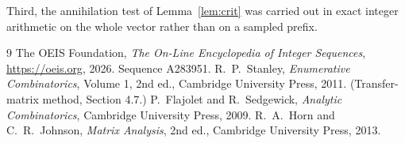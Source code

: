 \documentclass[11pt,a4paper]{article}
\theoremstyle{plain}
\theoremstyle{definition}
\begin{document}
Third, the annihilation test of Lemma~\ref{lem:crit} was carried out in exact integer
arithmetic on the whole vector rather than on a sampled prefix.

\begin{thebibliography}{9}
 The OEIS Foundation, \emph{The On-Line Encyclopedia of Integer
Sequences}, \url{https://oeis.org}, 2026. Sequence A283951.
 R.~P.~Stanley, \emph{Enumerative Combinatorics}, Volume 1, 2nd ed.,
Cambridge University Press, 2011. (Transfer-matrix method, Section 4.7.)
 P.~Flajolet and R.~Sedgewick, \emph{Analytic Combinatorics}, Cambridge
University Press, 2009.
 R.~A.~Horn and C.~R.~Johnson, \emph{Matrix Analysis}, 2nd ed., Cambridge
University Press, 2013.
\end{thebibliography}
\end{document}
